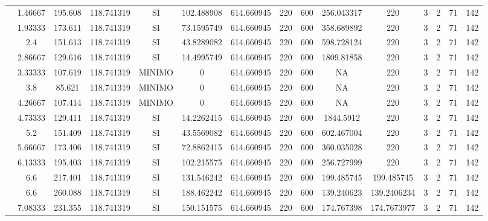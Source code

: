 \begin{table}[H]
{\begin{tabular}{|c|c|c|c|c|c|c|c|c|c|c|c|c|c|c|}
\cline{2-15}    & 1.46667 & 195.608 & 118.741319 & SI  & 102.488908 & 614.660945 & 220 & 600 & 256.043317 & 220 & 3   & 2   & 71  & 142 \bigstrut\\
\cline{2-15}    & 1.93333 & 173.611 & 118.741319 & SI  & 73.1595749 & 614.660945 & 220 & 600 & 358.689892 & 220 & 3   & 2   & 71  & 142 \bigstrut\\
\cline{2-15}    & 2.4 & 151.613 & 118.741319 & SI  & 43.8289082 & 614.660945 & 220 & 600 & 598.728124 & 220 & 3   & 2   & 71  & 142 \bigstrut\\
\cline{2-15}    & 2.86667 & 129.616 & 118.741319 & SI  & 14.4995749 & 614.660945 & 220 & 600 & 1809.81858 & 220 & 3   & 2   & 71  & 142 \bigstrut\\
\cline{2-15}    & 3.33333 & 107.619 & 118.741319 & MINIMO & 0   & 614.660945 & 220 & 600 & NA  & 220 & 3   & 2   & 71  & 142 \bigstrut\\
\cline{2-15}    & 3.8 & 85.621 & 118.741319 & MINIMO & 0   & 614.660945 & 220 & 600 & NA  & 220 & 3   & 2   & 71  & 142 \bigstrut\\
\cline{2-15}    & 4.26667 & 107.414 & 118.741319 & MINIMO & 0   & 614.660945 & 220 & 600 & NA  & 220 & 3   & 2   & 71  & 142 \bigstrut\\
\cline{2-15}    & 4.73333 & 129.411 & 118.741319 & SI  & 14.2262415 & 614.660945 & 220 & 600 & 1844.5912 & 220 & 3   & 2   & 71  & 142 \bigstrut\\
\cline{2-15}    & 5.2 & 151.409 & 118.741319 & SI  & 43.5569082 & 614.660945 & 220 & 600 & 602.467004 & 220 & 3   & 2   & 71  & 142 \bigstrut\\
\cline{2-15}    & 5.66667 & 173.406 & 118.741319 & SI  & 72.8862415 & 614.660945 & 220 & 600 & 360.035028 & 220 & 3   & 2   & 71  & 142 \bigstrut\\
\cline{2-15}    & 6.13333 & 195.403 & 118.741319 & SI  & 102.215575 & 614.660945 & 220 & 600 & 256.727999 & 220 & 3   & 2   & 71  & 142 \bigstrut\\
\cline{2-15}    & 6.6 & 217.401 & 118.741319 & SI  & 131.546242 & 614.660945 & 220 & 600 & 199.485745 & 199.485745 & 3   & 2   & 71  & 142 \bigstrut\\
\cline{2-15}    & 6.6 & 260.088 & 118.741319 & SI  & 188.462242 & 614.660945 & 220 & 600 & 139.240623 & 139.2406234 & 3   & 2   & 71  & 142 \bigstrut\\
\cline{2-15}    & 7.08333 & 231.355 & 118.741319 & SI  & 150.151575 & 614.660945 & 220 & 600 & 174.767398 & 174.7673977 & 3   & 2   & 71  & 142 \bigstrut\\

\end{tabular}}
\end{table}
